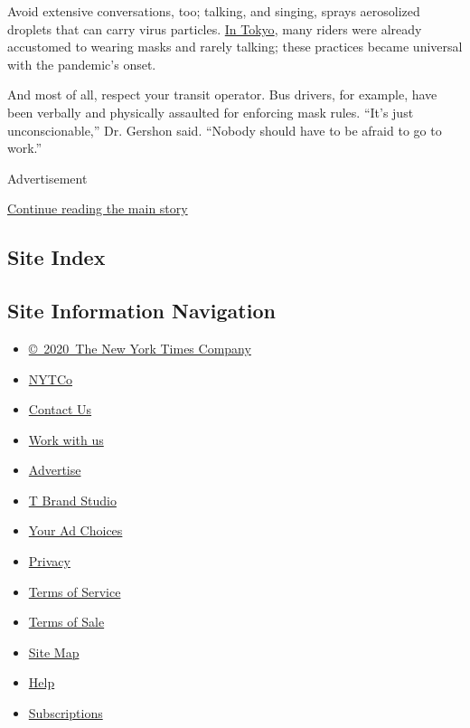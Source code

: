 Avoid extensive conversations, too; talking, and singing, sprays
aerosolized droplets that can carry virus particles.
\href{https://www.sciencemag.org/news/2020/05/japan-ends-its-covid-19-state-emergency}{In
Tokyo}, many riders were already accustomed to wearing masks and rarely
talking; these practices became universal with the pandemic's onset.

And most of all, respect your transit operator. Bus drivers, for
example, have been verbally and physically assaulted for enforcing mask
rules. ``It's just unconscionable,'' Dr. Gershon said. ``Nobody should
have to be afraid to go to work.''

Advertisement

\protect\hyperlink{after-bottom}{Continue reading the main story}

\hypertarget{site-index}{%
\subsection{Site Index}\label{site-index}}

\hypertarget{site-information-navigation}{%
\subsection{Site Information
Navigation}\label{site-information-navigation}}

\begin{itemize}
\tightlist
\item
  \href{https://help.nytimes3xbfgragh.onion/hc/en-us/articles/115014792127-Copyright-notice}{©~2020~The
  New York Times Company}
\end{itemize}

\begin{itemize}
\tightlist
\item
  \href{https://www.nytco.com/}{NYTCo}
\item
  \href{https://help.nytimes3xbfgragh.onion/hc/en-us/articles/115015385887-Contact-Us}{Contact
  Us}
\item
  \href{https://www.nytco.com/careers/}{Work with us}
\item
  \href{https://nytmediakit.com/}{Advertise}
\item
  \href{http://www.tbrandstudio.com/}{T Brand Studio}
\item
  \href{https://www.nytimes3xbfgragh.onion/privacy/cookie-policy\#how-do-i-manage-trackers}{Your
  Ad Choices}
\item
  \href{https://www.nytimes3xbfgragh.onion/privacy}{Privacy}
\item
  \href{https://help.nytimes3xbfgragh.onion/hc/en-us/articles/115014893428-Terms-of-service}{Terms
  of Service}
\item
  \href{https://help.nytimes3xbfgragh.onion/hc/en-us/articles/115014893968-Terms-of-sale}{Terms
  of Sale}
\item
  \href{https://spiderbites.nytimes3xbfgragh.onion}{Site Map}
\item
  \href{https://help.nytimes3xbfgragh.onion/hc/en-us}{Help}
\item
  \href{https://www.nytimes3xbfgragh.onion/subscription?campaignId=37WXW}{Subscriptions}
\end{itemize}
